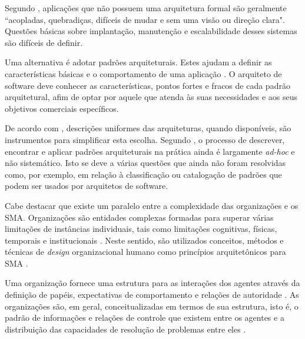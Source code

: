 Segundo , aplicações que não possuem uma arquitetura formal são geralmente ``acopladas, quebradiças, difíceis de mudar e sem uma visão ou direção clara". Questões básicas sobre implantação, manutenção e escalabilidade desses sistemas são difíceis de definir. 

Uma alternativa é adotar padrões arquiteturais. Estes ajudam a definir as características básicas e o comportamento de uma aplicação \cite{richards2015software}. O arquiteto de software deve conhecer as características, pontos fortes e fracos de cada padrão arquitetural, afim de optar por aquele que atenda às suas necessidades e aos seus objetivos comerciais específicos. 





De acordo com , descrições uniformes das arquiteturas, quando disponíveis, são instrumentos para simplificar esta escolha. Segundo , o processo de descrever, encontrar e aplicar padrões arquiteturais na prática ainda é largamente \textit{ad-hoc} e não sistemático. Isto se deve a várias questões que ainda não foram resolvidas como, por exemplo, em relação à classificação ou catalogação de padrões que podem ser usados por arquitetos de software.


Cabe destacar que existe um paralelo entre a complexidade das organizações e os SMA. Organizações são entidades complexas formadas para superar várias limitações de instâncias individuais, tais como limitações cognitivas, físicas, temporais e institucionais \cite{van2004organizational}. Neste sentido, são utilizados conceitos, métodos e técnicas de \textit{design} organizacional humano como princípios arquitetônicos para SMA \cite{van2004organizational}. 


Uma organização fornece uma estrutura para as interações dos agentes através da definição de papéis, expectativas de comportamento e relações de autoridade \cite{sycara1998multiagent}. As organizações são, em geral, conceitualizadas em termos de sua estrutura, isto é, o padrão de informações e relações de controle que existem entre os agentes e a distribuição das capacidades de resolução de problemas entre eles \cite{sycara1998multiagent}. 

